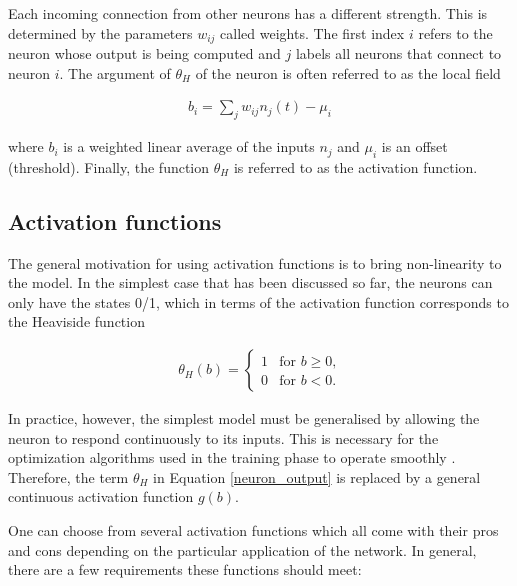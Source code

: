 Each incoming connection from other neurons has a different strength. This is determined by the parameters $ w_{ij} $ called weights. The first index $ i $ refers to the neuron whose output is being computed and $ j $ labels all neurons that connect
to neuron $ i $. The argument of $ \theta_H $ of the neuron is often referred to as the local field \cite{mehlig}

\begin{gather}
\label{local_field}
b_i = \sum\limits_{j}w_{ij}n_j(t) - \mu_i
\end{gather}

\noindent where $ b_i $ is a weighted linear average of the inputs $ n_j $ and $ \mu_i $ is an offset (threshold). Finally, the function $ \theta_H $ is referred to as the activation function. \cite{mehlig}

\subsection{Activation functions}

The general motivation for using activation functions is to bring non-linearity to the model. In the simplest case that has been discussed so far, the neurons can only have the states 0/1, which in terms of the activation function corresponds to the Heaviside function \cite{mehlig}

\begin{gather}
	\theta_H(b) = 
	\begin{cases}	
	1 & \text{for $b \geq 0$,}\\
	0 & \text{for $b < 0$.}
	\end{cases} 
\end{gather}

\noindent In practice, however, the simplest model must be generalised by allowing the neuron to respond continuously to its inputs. This is necessary for the optimization algorithms used in the training phase to operate smoothly \cite{groman}. Therefore, the term $ \theta_H $ in Equation \eqref{neuron_output} is replaced by a general continuous activation function $ g(b) $. \cite{mehlig}

\newpage

One can choose from several activation functions which all come with their pros and cons depending on the particular application of the network. In general, there are a few requirements these functions should meet: \cite{groman}

